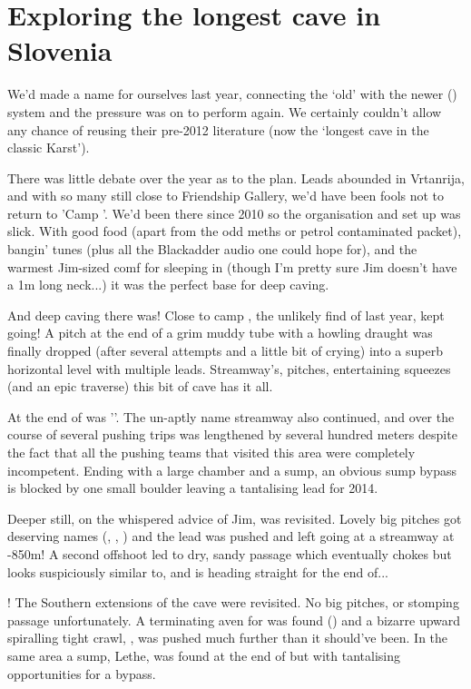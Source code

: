 \section{Exploring the longest cave in Slovenia}

We’d made a name for ourselves last year, connecting the ‘old’  with the newer  () system and the pressure was on to perform again. We certainly couldn’t allow  any chance of reusing their pre-2012 literature (now the ‘longest cave in the classic Karst’). 

There was little debate over the year as to the plan. Leads abounded in Vrtanrija, and with so many still close to Friendship Gallery, we’d have been fools not to return to 'Camp '. We’d been there since 2010 so the organisation and set up was slick. With good food (apart from the odd meths or petrol contaminated packet), bangin’ tunes (plus all the Blackadder audio one could hope for), and the warmest Jim-sized comf for sleeping in (though I’m pretty sure Jim doesn’t have a 1m long neck...) it was the perfect base for deep caving.

And deep caving there was! Close to camp , the unlikely find of last year, kept going! A pitch at the end of a grim muddy tube with a howling draught was finally dropped (after several attempts and a little bit of crying) into a superb horizontal level with multiple leads. Streamway’s, pitches, entertaining squeezes (and an epic traverse) this bit of cave has it all.

At the end of  was ''. The un-aptly name streamway also continued, and over the course of several pushing trips was lengthened by several hundred meters despite the fact that all the pushing teams that visited this area were completely incompetent. Ending with a large chamber and a sump, an obvious sump bypass is blocked by one small boulder leaving a tantalising lead for 2014.

Deeper still, on the whispered advice of Jim,  was revisited. Lovely big pitches got deserving names (, , ) and the lead was pushed and left going at a streamway at -850m! A second offshoot led to dry, sandy passage which eventually chokes but looks suspiciously similar to, and is heading straight for the end of...

! The Southern extensions of the cave were revisited. No big pitches, or stomping passage unfortunately. A terminating aven for  was found () and a bizarre upward spiralling tight crawl, , was pushed much further than it should’ve been. In the same area a sump, Lethe, was found at the end of  but with tantalising opportunities for a bypass.

